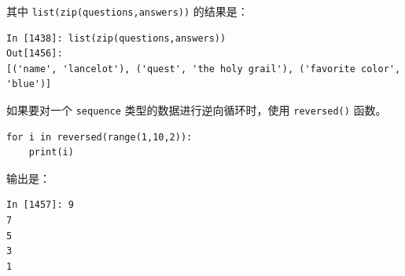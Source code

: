 \documentclass[10pt,a4paper,UTF8]{article}
\begin{document}
其中 \texttt{list(zip(questions,answers))} 的结果是：
\begin{verbatim}
In [1438]: list(zip(questions,answers))
Out[1456]: 
[('name', 'lancelot'), ('quest', 'the holy grail'), ('favorite color', 'blue')]
\end{verbatim}
如果要对一个 \texttt{sequence} 类型的数据进行逆向循环时，使用 \texttt{reversed()} 函数。

\begin{verbatim}
for i in reversed(range(1,10,2)):
    print(i)
\end{verbatim}
输出是：
\begin{verbatim}
In [1457]: 9
7
5
3
1
\end{verbatim}
\end{document}

